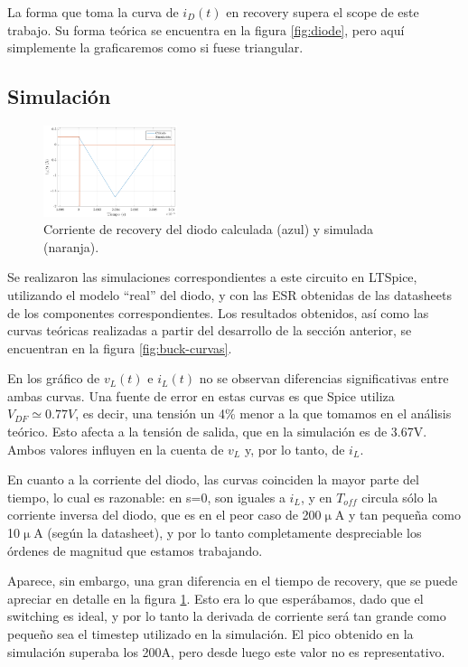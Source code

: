 \documentclass[e4_tp1_main.tex]{subfiles}
\begin{document}
La forma que toma la curva de $i_D(t)$ en recovery supera el scope de este trabajo. Su forma te\'orica se encuentra en la figura \ref{fig:diode}, pero aqu\'i simplemente la graficaremos como si fuese triangular. 



\subsection{Simulaci\'on}

\begin{figure}
	\centering
	\includegraphics[width=0.35\textwidth]{images/ej2/id-recovery.png}
	\caption{Corriente de recovery del diodo calculada (azul) y simulada (naranja).}
	\label{fig:id-recovery}
\end{figure}

Se realizaron las simulaciones correspondientes a este circuito en LTSpice, utilizando el modelo ``real'' del diodo, y con las ESR obtenidas de las datasheets de los componentes correspondientes. Los resultados obtenidos, as\'i como las curvas te\'oricas realizadas a partir del desarrollo de la secci\'on anterior, se encuentran en la figura \ref{fig:buck-curvas}.

En los gr\'afico de $v_L(t)$ e $i_L(t)$ no se observan diferencias significativas entre ambas curvas. Una fuente de error en estas curvas es que Spice utiliza $V_{DF} \simeq 0.77V$, es decir, una tensi\'on un 4\% menor a la que tomamos en el an\'alisis te\'orico. Esto afecta a la tensi\'on de salida, que en la simulaci\'on es de 3.67V. Ambos valores influyen en la cuenta de $v_L$ y, por lo tanto, de $i_L$.



En cuanto a la corriente del diodo, las curvas coinciden la mayor parte del tiempo, lo cual es razonable: en s=0, son iguales a $i_L$, y en $T_{off}$  circula s\'olo la corriente inversa del diodo, que es en el peor caso de 200$\upmu$A y tan peque\~na como 10$\upmu$A (seg\'un la datasheet), y por lo tanto completamente despreciable los \'ordenes de magnitud que estamos trabajando.


Aparece, sin embargo, una gran diferencia en el tiempo de recovery, que se puede apreciar en detalle en la figura \ref{fig:id-recovery}. Esto era lo que esper\'abamos, dado que el switching es ideal, y por lo tanto la derivada de corriente ser\'a tan grande como peque\~no sea el timestep utilizado en la simulaci\'on. El pico obtenido en la simulaci\'on superaba los 200A, pero desde luego este valor no es representativo. 
\end{document}
